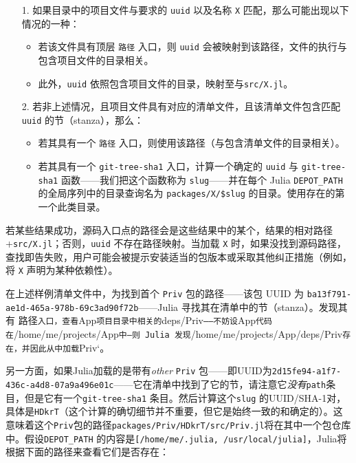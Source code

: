 \begin{itemize}
\item[1. ] 如果目录中的项目文件与要求的 \texttt{uuid} 以及名称 \texttt{X} 匹配，那么可能出现以下情况的一种：

\begin{itemize}
\item 若该文件具有顶层 \texttt{路径} 入口，则 \texttt{uuid} 会被映射到该路径，文件的执行与包含项目文件的目录相关。


\item 此外，\texttt{uuid} 依照包含项目文件的目录，映射至与\texttt{src/X.jl}。

\end{itemize}

\item[2. ] 若非上述情况，且项目文件具有对应的清单文件，且该清单文件包含匹配 \texttt{uuid} 的节（stanza），那么：

\begin{itemize}
\item 若其具有一个 \texttt{路径} 入口，则使用该路径（与包含清单文件的目录相关）。


\item 若其具有一个 \texttt{git-tree-sha1} 入口，计算一个确定的 \texttt{uuid} 与 \texttt{git-tree-sha1} 函数——我们把这个函数称为 \texttt{slug}——并在每个 Julia \texttt{DEPOT\_PATH} 的全局序列中的目录查询名为 \texttt{packages/X/\$slug} 的目录。使用存在的第一个此类目录。

\end{itemize}
\end{itemize}


若某些结果成功，源码入口点的路径会是这些结果中的某个，结果的相对路径+\texttt{src/X.jl}；否则，\texttt{uuid} 不存在路径映射。当加载 \texttt{X} 时，如果没找到源码路径，查找即告失败，用户可能会被提示安装适当的包版本或采取其他纠正措施（例如，将 \texttt{X} 声明为某种依赖性）。



在上述样例清单文件中，为找到首个 \texttt{Priv} 包的路径——该包 UUID 为 \texttt{ba13f791-ae1d-465a-978b-69c3ad90f72b}——Julia 寻找其在清单中的节（stanza）。发现其有 路径\texttt{入口，查看}App\texttt{项目目录中相关的}deps/Priv\texttt{——不妨设}App\texttt{代码在}/home/me/projects/App\texttt{中—则 Julia 发现}/home/me/projects/App/deps/Priv\texttt{存在，并因此从中加载}Priv`。



另一方面，如果Julia加载的是带有\emph{other} \texttt{Priv} 包——即UUID为\texttt{2d15fe94-a1f7-436c-a4d8-07a9a496e01c}——它在清单中找到了它的节，请注意它\emph{没有}\texttt{path}条目，但是它有一个\texttt{git-tree-sha1} 条目。然后计算这个\texttt{slug} 的UUID/SHA-1对，具体是\texttt{HDkrT}（这个计算的确切细节并不重要，但它是始终一致的和确定的）。这意味着这个\texttt{Priv}包的路径\texttt{packages/Priv/HDkrT/src/Priv.jl}将在其中一个包仓库中。假设\texttt{DEPOT\_PATH} 的内容是\texttt{[{\textquotedbl}/home/me/.julia{\textquotedbl}, {\textquotedbl}/usr/local/julia{\textquotedbl}]}，Julia将根据下面的路径来查看它们是否存在：



